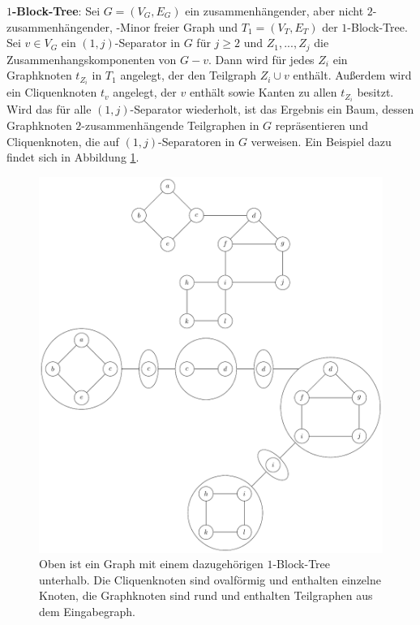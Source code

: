 \textbf{$1$-Block-Tree}: Sei $G = (V_G, E_G)$ ein zusammenhängender, aber nicht $2$-zusammenhängender, \kf-Minor freier Graph und $T_1 = (V_T, E_T)$ der $1$-Block-Tree.
Sei $v \in V_G$ ein $(1, j)$-Separator in $G$ für $j \geq 2$ und $Z_1, ..., Z_j$ die Zusammenhangskomponenten von $G - v$.
Dann wird für jedes $Z_i$ ein Graphknoten $t_{Z_i}$ in $T_1$ angelegt, der den Teilgraph $Z_i \cup v$ enthält.
Außerdem wird ein Cliquenknoten $t_v$ angelegt, der $v$ enthält sowie Kanten zu allen $t_{Z_i}$ besitzt.
Wird das für alle $(1, j)$-Separator wiederholt, ist das Ergebnis ein Baum, dessen Graphknoten $2$-zusammenhängende Teilgraphen in $G$ repräsentieren und Cliquenknoten, die auf $(1, j)$-Separatoren in $G$ verweisen.
Ein Beispiel dazu findet sich in Abbildung \ref{fig:1-Block-Tree}.
\begin{figure}[H]
  \centering
  \includegraphics[width=\textwidth,height=\textheight,keepaspectratio]{bilder/1-Block-Tree.pdf}
  \caption{Oben ist ein Graph mit einem dazugehörigen $1$-Block-Tree unterhalb.
           Die Cliquenknoten sind ovalförmig und enthalten einzelne Knoten, die Graphknoten sind rund und enthalten Teilgraphen aus dem Eingabegraph.}
  \label{fig:1-Block-Tree}
\end{figure}


